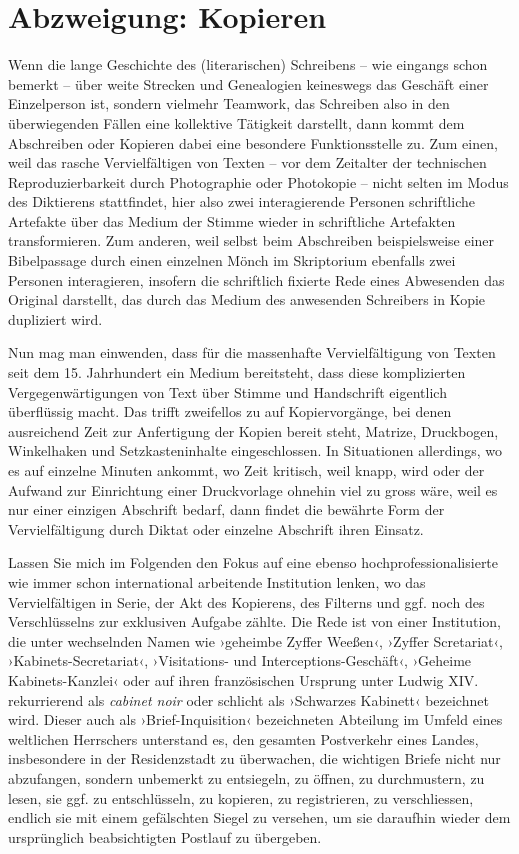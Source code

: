 \documentclass[a4paper,12pt]{article}
\newcommand{\inanf}[1]{›#1‹}
\begin{document}
\section*{Abzweigung: Kopieren}

Wenn die lange Geschichte des (literarischen) Schreibens – wie eingangs schon bemerkt – über weite Strecken und Genealogien keineswegs das Geschäft einer Einzelperson ist, sondern vielmehr Teamwork, das Schreiben also in den überwiegenden Fällen eine kollektive Tätigkeit darstellt, dann kommt dem Abschreiben oder Kopieren dabei eine besondere Funktionsstelle zu. Zum einen, weil das rasche Vervielfältigen von Texten – vor dem Zeitalter der technischen Reproduzierbarkeit durch Photographie oder Photokopie – nicht selten im Modus des Diktierens stattfindet, hier also zwei interagierende Personen schriftliche Artefakte über das Medium der Stimme wieder in schriftliche Artefakten transformieren. Zum anderen, weil selbst beim Abschreiben beispielsweise einer Bibelpassage durch einen einzelnen Mönch im Skriptorium ebenfalls zwei Personen interagieren, insofern die schriftlich fixierte Rede eines Abwesenden das Original darstellt, das durch das Medium des anwesenden Schreibers in Kopie dupliziert wird. 

Nun mag man einwenden, dass für die massenhafte Vervielfältigung von Texten seit dem 15. Jahrhundert ein Medium bereitsteht, dass diese komplizierten Vergegenwärtigungen von Text über Stimme und Handschrift eigentlich überflüssig macht. Das trifft zweifellos zu auf Kopiervorgänge, bei denen ausreichend Zeit zur Anfertigung der Kopien bereit steht, Matrize, Druckbogen, Winkelhaken und Setzkasteninhalte eingeschlossen. In Situationen allerdings, wo es auf einzelne Minuten ankommt, wo Zeit kritisch, weil knapp, wird oder der Aufwand zur Einrichtung einer Druckvorlage ohnehin viel zu gross wäre, weil es nur einer einzigen Abschrift bedarf, dann findet die bewährte Form der Vervielfältigung durch Diktat oder einzelne Abschrift ihren Einsatz.

Lassen Sie mich im Folgenden den Fokus auf eine ebenso hochprofessionalisierte wie immer schon international arbeitende Institution lenken, wo das Vervielfältigen in Serie, der Akt des Kopierens, des Filterns und ggf. noch des Verschlüsselns zur exklusiven Aufgabe zählte. Die Rede ist von einer Institution, die unter wechselnden Namen wie ›geheimbe Zyffer Weeßen‹, ›Zyffer Scretariat‹, ›Kabinets-Secretariat‹, ›Visitations- und Interceptions-Geschäft‹, ›Geheime Kabinets-Kanzlei‹ oder auf ihren französischen Ursprung unter Ludwig XIV. rekurrierend als \emph{cabinet noir} oder schlicht als \inanf{Schwarzes Kabinett} bezeichnet wird. Dieser auch als \inanf{Brief-Inquisition} bezeichneten Abteilung im Umfeld eines weltlichen Herrschers unterstand es, den gesamten Postverkehr eines Landes, insbesondere in der Residenzstadt zu überwachen, die wichtigen Briefe nicht nur abzufangen, sondern unbemerkt zu entsiegeln, zu öffnen, zu durchmustern, zu lesen, sie ggf. zu entschlüsseln, zu kopieren, zu registrieren, zu verschliessen, endlich sie mit einem gefälschten Siegel zu versehen, um sie daraufhin wieder dem ursprünglich beabsichtigten Postlauf zu übergeben. 
\end{document}
